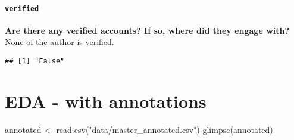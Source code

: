 \documentclass[
]{article}
\newenvironment{Shaded}{\begin{snugshade}}{\end{snugshade}}
\newcommand{\FunctionTok}[1]{\textcolor[rgb]{0.00,0.00,0.00}{#1}}
\newcommand{\NormalTok}[1]{#1}
\newcommand{\OtherTok}[1]{\textcolor[rgb]{0.56,0.35,0.01}{#1}}
\newcommand{\SpecialCharTok}[1]{\textcolor[rgb]{0.00,0.00,0.00}{#1}}
\newcommand{\StringTok}[1]{\textcolor[rgb]{0.31,0.60,0.02}{#1}}
\begin{document}
\hypertarget{verified}{%
\paragraph{\texorpdfstring{\texttt{verified}}{verified}}\label{verified}}

\textbf{Are there any verified accounts? If so, where did they engage
with?} None of the author is verified.

\begin{Shaded}
\end{Shaded}

\begin{verbatim}
## [1] "False"
\end{verbatim}

\newpage

\hypertarget{eda---with-annotations}{%
\section{EDA - with annotations}\label{eda---with-annotations}}

\begin{Shaded}
\begin{Highlighting}[]
\NormalTok{annotated }\OtherTok{\textless{}{-}} \FunctionTok{read.csv}\NormalTok{(}\StringTok{"data/master\_annotated.csv"}\NormalTok{)}
\FunctionTok{glimpse}\NormalTok{(annotated)}
\end{Highlighting}
\end{Shaded}
\end{document}
